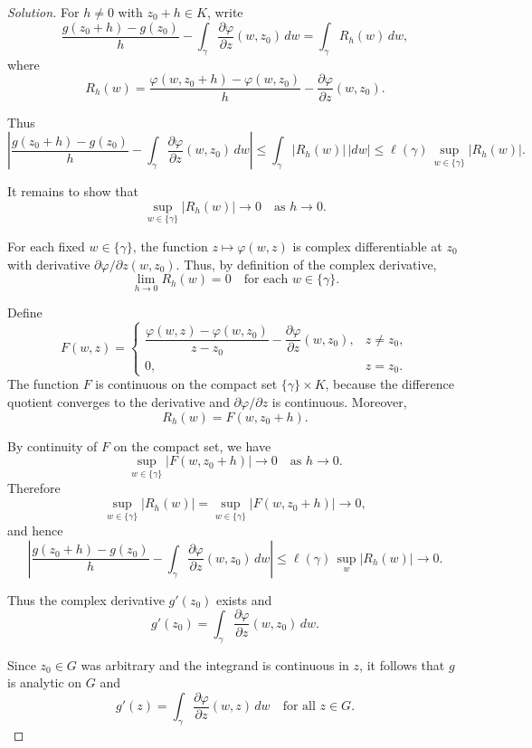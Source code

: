 \documentclass[12pt, a4paper]{report}
\theoremstyle{spaced}
\begin{document}
\begin{proof}[Solution]
	For $h\neq 0$ with $z_0+h\in K$, write
	\[
		\frac{g(z_0+h)-g(z_0)}{h}
		- \int_{\gamma} \frac{\partial\varphi}{\partial z}(w,z_0)\,dw
		= \int_{\gamma} R_h(w)\,dw,
	\]
	where
	\[
		R_h(w)
		= \frac{\varphi(w,z_0+h)-\varphi(w,z_0)}{h}
		- \frac{\partial\varphi}{\partial z}(w,z_0).
	\]

	Thus
	\[
		\left|
		\frac{g(z_0+h)-g(z_0)}{h}
		- \int_{\gamma} \frac{\partial\varphi}{\partial z}(w,z_0)\,dw
		\right|
		\le \int_{\gamma} |R_h(w)|\,|dw|
		\le \ell(\gamma)\,\sup_{w\in\{\gamma\}} |R_h(w)|.
	\]

	It remains to show that
	\[
		\sup_{w\in\{\gamma\}} |R_h(w)| \longrightarrow 0
		\quad\text{as } h\to 0.
	\]

	For each fixed $w\in\{\gamma\}$, the function $z\mapsto \varphi(w,z)$
	is complex differentiable at $z_0$ with derivative
	$\partial\varphi/\partial z(w,z_0)$.
	Thus, by definition of the complex derivative,
	\[
		\lim_{h\to 0} R_h(w)=0
		\quad\text{for each } w\in\{\gamma\}.
	\]

	Define
	\[
		F(w,z)
		= \begin{cases}
			\dfrac{\varphi(w,z)-\varphi(w,z_0)}{z-z_0}
			- \dfrac{\partial\varphi}{\partial z}(w,z_0),
			   & z\ne z_0, \\[6pt]
			0, & z=z_0.
		\end{cases}
	\]
	The function $F$ is continuous on the compact set $\{\gamma\}\times K$,
	because the difference quotient converges to the derivative and
	$\partial\varphi/\partial z$ is continuous.
	Moreover,
	\[
		R_h(w) = F(w,z_0+h).
	\]

	By continuity of $F$ on the compact set, we have
	\[
		\sup_{w\in\{\gamma\}} |F(w,z_0+h)|
		\longrightarrow 0
		\quad\text{as } h\to 0.
	\]
	Therefore
	\[
		\sup_{w\in\{\gamma\}} |R_h(w)|
		=
		\sup_{w\in\{\gamma\}} |F(w,z_0+h)|
		\longrightarrow 0,
	\]
	and hence
	\[
		\left|
		\frac{g(z_0+h)-g(z_0)}{h}
		- \int_{\gamma} \frac{\partial\varphi}{\partial z}(w,z_0)\,dw
		\right|
		\le \ell(\gamma)\,\sup_{w} |R_h(w)|
		\longrightarrow 0.
	\]

	Thus the complex derivative $g'(z_0)$ exists and
	\[
		g'(z_0)=\int_{\gamma} \frac{\partial\varphi}{\partial z}(w,z_0)\,dw.
	\]

	Since $z_0\in G$ was arbitrary and the integrand is continuous in $z$,
	it follows that $g$ is analytic on $G$ and
	\[
		g'(z)=\int_{\gamma} \frac{\partial\varphi}{\partial z}(w,z)\,dw
		\quad\text{for all } z\in G.
	\]
\end{proof}
\end{document}
